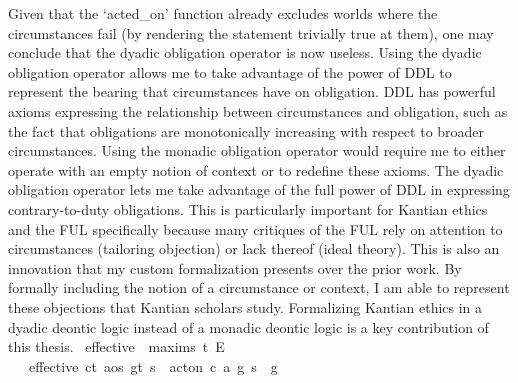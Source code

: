 \begin{isabellebody}
{Given that the `acted\_on' function already excludes worlds where the circumstances fail (by rendering 
the statement trivially true at them), one may conclude that the dyadic obligation operator is now useless. 
Using the dyadic obligation operator allows me to take advantage of the power of DDL to represent the bearing 
that circumstances have on obligation. DDL has powerful axioms expressing the relationship between circumstances 
and obligation, such as the fact that obligations are monotonically increasing with respect to broader 
circumstances. Using the monadic obligation operator would require me to either operate with an empty 
notion of context or to redefine these axioms. The dyadic obligation operator lets me take advantage of the full 
power of DDL in expressing contrary-to-duty obligations. This is particularly important for Kantian ethics 
and the FUL specifically because many critiques of the FUL rely on attention to circumstances (tailoring 
objection) or lack thereof (ideal theory). This is also an innovation that my custom formalization presents 
over the prior work. By formally including the notion of a circumstance or context, I am able to represent 
these objections that Kantian scholars study. Formalizing Kantian ethics in a dyadic deontic logic 
instead of a monadic deontic logic is a key contribution of this thesis.%
}\isanewline
\isanewline
{}\isamarkupfalse%
\ effective\ {\isacharcolon}{\isacharcolon}\ {\isachardoublequoteopen}maxim{\isasymRightarrow}s{\isasymRightarrow}\ t{\isachardoublequoteclose}\ {\isacharparenleft}{\isachardoublequoteopen}E\ {\isacharunderscore}\ {\isacharunderscore}{\isachardoublequoteclose}{\isacharparenright}\isanewline
\ \ \ {\isachardoublequoteopen}effective\ {\isacharparenleft}c{\isacharcolon}{\isacharcolon}t{\isacharcomma}\ a{\isacharcolon}{\isacharcolon}os{\isacharcomma}\ g{\isacharcolon}{\isacharcolon}t{\isacharparenright}\ s\ {\isacharequal}\ {\isacharparenleft}{\isacharparenleft}act{\isacharunderscore}on\ {\isacharparenleft}c{\isacharcomma}\ a{\isacharcomma}\ g{\isacharparenright}\ s{\isacharparenright}\ \isactrlbold {\isasymrightarrow}\ g{\isacharparenright}{\isachardoublequoteclose}\isanewline
%
\isanewline
\isanewline
%
\isadelimtheory
%
\endisadelimtheory
%
\isatagtheory
%
\endisatagtheory
{\isafoldtheory}%
%
\isadelimtheory
%
\endisadelimtheory
%
\end{isabellebody}%
